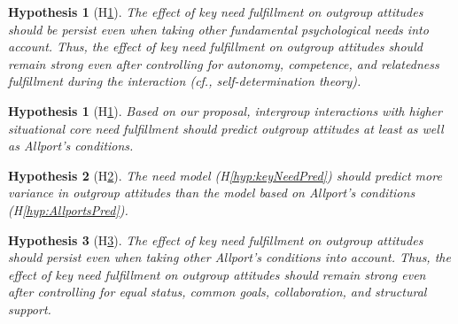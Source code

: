 \documentclass[man, 12pt, a4paper, mask]{apa7}
\theoremstyle{break}
\theoremstyle{plain}
\newtheorem{hyp}{Hypothesis}
\newtheorem{subhyp}{Hypothesis}
\begin{document}
\begin{subhyp}[H\ref{hyp:keyNeedSDT}] \label{hyp:keyNeedSDT}
\addtolength{\leftskip}{2.5em}
The effect of key need fulfillment on outgroup attitudes should be persist even when taking other fundamental psychological needs into account. Thus, the effect of key need fulfillment on outgroup attitudes should remain strong even after controlling for autonomy, competence, and relatedness fulfillment during the interaction (cf., self-determination theory). 
\end{subhyp}

\begin{hyp}[H\ref{hyp:comparison}] \label{hyp:comparison}
Based on our proposal, intergroup interactions with higher situational core need fulfillment should predict outgroup attitudes at least as well as Allport's conditions.
\end{hyp}

\setcounter{subhyp}{0}
\begin{subhyp}[H\ref{hyp:compModel}] \label{hyp:compModel}
\addtolength{\leftskip}{2.5em}
The need model (H\ref{hyp:keyNeedPred}) should predict more variance in outgroup attitudes than the model based on Allport's conditions (H\ref{hyp:AllportsPred}).
\end{subhyp}

\begin{subhyp}[H\ref{hyp:compTogether}] \label{hyp:compTogether}
\addtolength{\leftskip}{2.5em}
The  effect of key need fulfillment on outgroup attitudes should  persist even when taking other Allport's conditions into account. Thus, the effect of key need fulfillment on outgroup attitudes should remain strong even after controlling for equal status, common goals, collaboration, and structural support.  
\end{subhyp}
\end{document}

